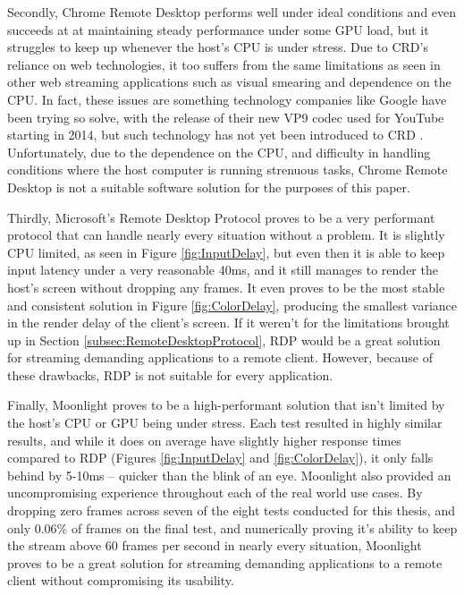 Secondly, Chrome Remote Desktop performs well under ideal conditions and even succeeds at at maintaining steady performance under some GPU load, but it struggles to keep up whenever the host's CPU is under stress.
Due to CRD's reliance on web technologies, it too suffers from the same limitations as seen in other web streaming applications such as visual smearing and dependence on the CPU.
In fact, these issues are something technology companies like Google have been trying so solve, with the release of their new VP9 codec used for YouTube starting in 2014, but such technology has not yet been introduced to CRD \cite{google_io_vp9}.
Unfortunately, due to the dependence on the CPU, and difficulty in handling conditions where the host computer is running strenuous tasks, Chrome Remote Desktop is not a suitable software solution for the purposes of this paper.

Thirdly, Microsoft's Remote Desktop Protocol proves to be a very performant protocol that can handle nearly every situation without a problem.
It is slightly CPU limited, as seen in Figure \ref{fig:InputDelay}, but even then it is able to keep input latency under a very reasonable 40ms, and it still manages to render the host's screen without dropping any frames.
It even proves to be the most stable and consistent solution in Figure \ref{fig:ColorDelay}, producing the smallest variance in the render delay of the client's screen.
If it weren't for the limitations brought up in Section \ref{subsec:RemoteDesktopProtocol}, RDP would be a great solution for streaming demanding applications to a remote client.
However, because of these drawbacks, RDP is not suitable for every application.

Finally, Moonlight proves to be a high-performant solution that isn't limited by the host's CPU or GPU being under stress.
Each test resulted in highly similar results, and while it does on average have slightly higher response times compared to RDP (Figures \ref{fig:InputDelay} and \ref{fig:ColorDelay}), it only falls behind by 5-10ms -- quicker than the blink of an eye.
Moonlight also provided an uncompromising experience throughout each of the real world use cases.
By dropping zero frames across seven of the eight tests conducted for this thesis, and only 0.06\% of frames on the final test, and numerically proving it's ability to keep the stream above 60 frames per second in nearly every situation, Moonlight proves to be a great solution for streaming demanding applications to a remote client without compromising its usability.